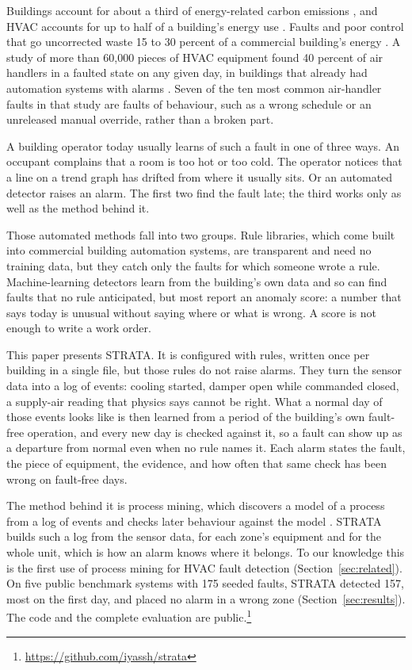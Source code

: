 \documentclass[conference]{IEEEtran}
\begin{document}
Buildings account for about a third of energy-related carbon emissions \cite{unep2025gsr}, and HVAC accounts for up to half of a building's energy use \cite{bi2024aihvacreview}. Faults and poor control that go uncorrected waste 15 to 30 percent of a commercial building's energy \cite{katipamula2005fddreview1}. A study of more than 60,000 pieces of HVAC equipment found 40 percent of air handlers in a faulted state on any given day, in buildings that already had automation systems with alarms \cite{crowe2023faultprevalence}. Seven of the ten most common air-handler faults in that study are faults of behaviour, such as a wrong schedule or an unreleased manual override, rather than a broken part.

A building operator today usually learns of such a fault in one of three ways. An occupant complains that a room is too hot or too cold. The operator notices that a line on a trend graph has drifted from where it usually sits. Or an automated detector raises an alarm. The first two find the fault late; the third works only as well as the method behind it.

Those automated methods fall into two groups. Rule libraries, which come built into commercial building automation systems, are transparent and need no training data, but they catch only the faults for which someone wrote a rule. Machine-learning detectors learn from the building's own data and so can find faults that no rule anticipated, but most report an anomaly score: a number that says today is unusual without saying where or what is wrong. A score is not enough to write a work order.

This paper presents STRATA. It is configured with rules, written once per building in a single file, but those rules do not raise alarms. They turn the sensor data into a log of events: cooling started, damper open while commanded closed, a supply-air reading that physics says cannot be right. What a normal day of those events looks like is then learned from a period of the building's own fault-free operation, and every new day is checked against it, so a fault can show up as a departure from normal even when no rule names it. Each alarm states the fault, the piece of equipment, the evidence, and how often that same check has been wrong on fault-free days.

The method behind it is process mining, which discovers a model of a process from a log of events and checks later behaviour against the model \cite{vanderaalst2016processmining}. STRATA builds such a log from the sensor data, for each zone's equipment and for the whole unit, which is how an alarm knows where it belongs. To our knowledge this is the first use of process mining for HVAC fault detection (Section~\ref{sec:related}). On five public benchmark systems with 175 seeded faults, STRATA detected 157, most on the first day, and placed no alarm in a wrong zone (Section~\ref{sec:results}). The code and the complete evaluation are public.\footnote{\url{https://github.com/iyassh/strata}}
\end{document}
